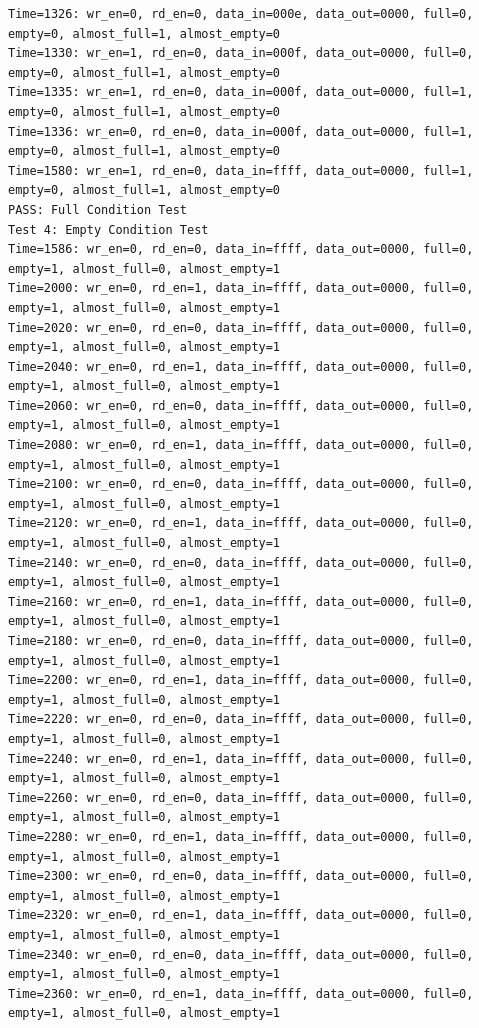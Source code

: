 \documentclass[UTF8]{ctexart}
\begin{document}
\begin{lstlisting}[frame=shadowbox]
Time=1326: wr_en=0, rd_en=0, data_in=000e, data_out=0000, full=0, empty=0, almost_full=1, almost_empty=0
Time=1330: wr_en=1, rd_en=0, data_in=000f, data_out=0000, full=0, empty=0, almost_full=1, almost_empty=0
Time=1335: wr_en=1, rd_en=0, data_in=000f, data_out=0000, full=1, empty=0, almost_full=1, almost_empty=0
Time=1336: wr_en=0, rd_en=0, data_in=000f, data_out=0000, full=1, empty=0, almost_full=1, almost_empty=0
Time=1580: wr_en=1, rd_en=0, data_in=ffff, data_out=0000, full=1, empty=0, almost_full=1, almost_empty=0
PASS: Full Condition Test
Test 4: Empty Condition Test
Time=1586: wr_en=0, rd_en=0, data_in=ffff, data_out=0000, full=0, empty=1, almost_full=0, almost_empty=1
Time=2000: wr_en=0, rd_en=1, data_in=ffff, data_out=0000, full=0, empty=1, almost_full=0, almost_empty=1
Time=2020: wr_en=0, rd_en=0, data_in=ffff, data_out=0000, full=0, empty=1, almost_full=0, almost_empty=1
Time=2040: wr_en=0, rd_en=1, data_in=ffff, data_out=0000, full=0, empty=1, almost_full=0, almost_empty=1
Time=2060: wr_en=0, rd_en=0, data_in=ffff, data_out=0000, full=0, empty=1, almost_full=0, almost_empty=1
Time=2080: wr_en=0, rd_en=1, data_in=ffff, data_out=0000, full=0, empty=1, almost_full=0, almost_empty=1
Time=2100: wr_en=0, rd_en=0, data_in=ffff, data_out=0000, full=0, empty=1, almost_full=0, almost_empty=1
Time=2120: wr_en=0, rd_en=1, data_in=ffff, data_out=0000, full=0, empty=1, almost_full=0, almost_empty=1
Time=2140: wr_en=0, rd_en=0, data_in=ffff, data_out=0000, full=0, empty=1, almost_full=0, almost_empty=1
Time=2160: wr_en=0, rd_en=1, data_in=ffff, data_out=0000, full=0, empty=1, almost_full=0, almost_empty=1
Time=2180: wr_en=0, rd_en=0, data_in=ffff, data_out=0000, full=0, empty=1, almost_full=0, almost_empty=1
Time=2200: wr_en=0, rd_en=1, data_in=ffff, data_out=0000, full=0, empty=1, almost_full=0, almost_empty=1
Time=2220: wr_en=0, rd_en=0, data_in=ffff, data_out=0000, full=0, empty=1, almost_full=0, almost_empty=1
Time=2240: wr_en=0, rd_en=1, data_in=ffff, data_out=0000, full=0, empty=1, almost_full=0, almost_empty=1
Time=2260: wr_en=0, rd_en=0, data_in=ffff, data_out=0000, full=0, empty=1, almost_full=0, almost_empty=1
Time=2280: wr_en=0, rd_en=1, data_in=ffff, data_out=0000, full=0, empty=1, almost_full=0, almost_empty=1
Time=2300: wr_en=0, rd_en=0, data_in=ffff, data_out=0000, full=0, empty=1, almost_full=0, almost_empty=1
Time=2320: wr_en=0, rd_en=1, data_in=ffff, data_out=0000, full=0, empty=1, almost_full=0, almost_empty=1
Time=2340: wr_en=0, rd_en=0, data_in=ffff, data_out=0000, full=0, empty=1, almost_full=0, almost_empty=1
Time=2360: wr_en=0, rd_en=1, data_in=ffff, data_out=0000, full=0, empty=1, almost_full=0, almost_empty=1

\end{lstlisting}
\end{document}
